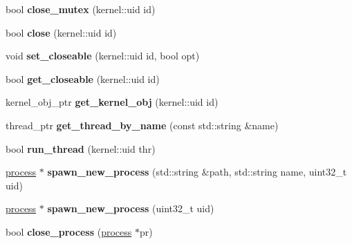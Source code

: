 \begin{DoxyCompactItemize}
bool {\bfseries close\+\_\+mutex} (kernel\+::uid id)
\item 
\mbox{\label{classeka2l1_1_1kernel__system_a825444503373214d5a0a2895bc11be06}} 
bool {\bfseries close} (kernel\+::uid id)
\item 
\mbox{\label{classeka2l1_1_1kernel__system_a3cd60052832051b32f5942ae865c76ad}} 
void {\bfseries set\+\_\+closeable} (kernel\+::uid id, bool opt)
\item 
\mbox{\label{classeka2l1_1_1kernel__system_a5d317d55a1b39313fe01790352a26c21}} 
bool {\bfseries get\+\_\+closeable} (kernel\+::uid id)
\item 
\mbox{\label{classeka2l1_1_1kernel__system_ae204befb453ce5a1d83051f1c24192fb}} 
kernel\+\_\+obj\+\_\+ptr {\bfseries get\+\_\+kernel\+\_\+obj} (kernel\+::uid id)
\item 
\mbox{\label{classeka2l1_1_1kernel__system_a373ece44b7a922c170acb9410db1b2cd}} 
thread\+\_\+ptr {\bfseries get\+\_\+thread\+\_\+by\+\_\+name} (const std\+::string \&name)
\item 
\mbox{\label{classeka2l1_1_1kernel__system_a91c8a0fe8759f6aaf67669518e87a196}} 
bool {\bfseries run\+\_\+thread} (kernel\+::uid thr)
\item 
\mbox{\label{classeka2l1_1_1kernel__system_a343d1cee59f5e5d6a5a6898776304d22}} 
\mbox{\hyperlink{classeka2l1_1_1process}{process}} $\ast$ {\bfseries spawn\+\_\+new\+\_\+process} (std\+::string \&path, std\+::string name, uint32\+\_\+t uid)
\item 
\mbox{\label{classeka2l1_1_1kernel__system_ac346f6887978c0a8777d4c8ecaba49c8}} 
\mbox{\hyperlink{classeka2l1_1_1process}{process}} $\ast$ {\bfseries spawn\+\_\+new\+\_\+process} (uint32\+\_\+t uid)
\item 
\mbox{\label{classeka2l1_1_1kernel__system_ad7c6d8a57c1bc13163729aa445168ccb}} 
bool {\bfseries close\+\_\+process} (\mbox{\hyperlink{classeka2l1_1_1process}{process}} $\ast$pr)

\end{DoxyCompactItemize}
